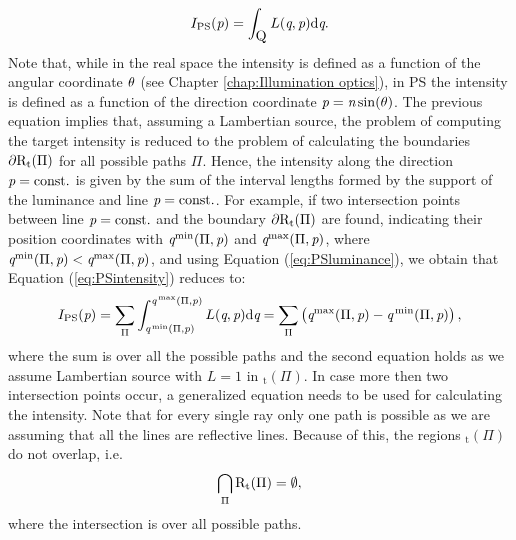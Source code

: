 \begin{equation}
\label{eq:PSintensity}
I_{\textrm{PS}}(\textit{p}) = \int_{\mbox{$\textup{Q}_{\textit{}}$}}L(\textit{q}, \textit{p}) \textrm{d}\textit{q}.
\end{equation}
Note that, while in the real space the intensity is defined as a function of the angular coordinate $\theta$ (see Chapter \ref{chap:Illumination optics}), in PS the intensity is defined as a function of the direction coordinate $\textit{p}=\textit{n}\sin(\theta)$. The previous equation implies that, assuming a Lambertian source, the problem of computing the target intensity is reduced to the problem of calculating the boundaries
$\partial\mbox{$\textup{R}$}_\textrm{t}(\Pi)$ for all possible paths $\Pi$. Hence, the intensity along the direction $\textit{p}= \textrm{const.}$ is given by the sum of the interval lengths formed by the support of the luminance and line $\textit{p}=\textrm{const.}$. For example, if two intersection points between line $\textit{p}= \textrm{const.}$ and the boundary $\partial\mbox{$\textup{R}$}_\textrm{t}(\Pi)$ are found, indicating their position coordinates with $\textit{q}^\textrm{min}(\Pi,\textit{p})$ and $\textit{q}^\textrm{max}(\Pi,\textit{p})$, where $\textit{q}^\textrm{min}(\Pi,\textit{p})<\textit{q}^\textrm{max}(\Pi,\textit{p})$, and using Equation (\ref{eq:PSluminance}), we obtain that Equation (\ref{eq:PSintensity}) reduces to:
\begin{equation}\label{eta2}
I_{\textrm{PS}}(\textit{p}) = \sum_{\Pi}\int_{\textit{q}^\textrm{\,min}(\Pi, \textit{p})}^{\textit{q}^\textrm{\,max}(\Pi,\textit{p})}L(\textit{q}, \textit{p})\textrm{d}\textit{q} = \sum_{\Pi}\big (\textit{q}^\textrm{max}(\Pi,\textit{p})-\textit{q}^\textrm{\,min}(\Pi,\textit{p})\big )\,,
\end{equation}
where the sum is over all the possible paths and the second equation holds as we assume Lambertian source with $L=1$ in $_\textrm{t}(\Pi).$ In case more then two intersection points occur, a generalized equation needs to be used for calculating the intensity. 
Note that for every single ray only one path is possible as we are assuming that all the lines are reflective lines.
Because of this, the regions $_\textrm{t}(\Pi)$ do not overlap, i.e.
\begin{equation}
\bigcap_{\Pi}\mbox{$\textup{R}$}_\textrm{t}(\Pi)= \emptyset,
\end{equation}
where the intersection is over all possible paths. \\ \indent
